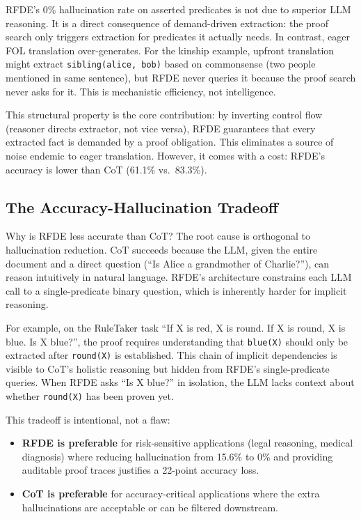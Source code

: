 \documentclass[11pt,letterpaper]{article}
\begin{document}
RFDE's 0\% hallucination rate on asserted predicates is not due to superior LLM reasoning. It is a direct consequence of
demand-driven extraction: the proof search only triggers extraction for predicates it actually needs. In contrast, eager FOL
translation over-generates. For the kinship example, upfront translation might extract \texttt{sibling(alice, bob)} based on
commonsense (two people mentioned in same sentence), but RFDE never queries it because the proof search never asks for it.
This is mechanistic efficiency, not intelligence.

This structural property is the core contribution: by inverting control flow (reasoner directs extractor, not vice versa),
RFDE guarantees that every extracted fact is demanded by a proof obligation. This eliminates a source of noise endemic to
eager translation. However, it comes with a cost: RFDE's accuracy is lower than CoT (61.1\% vs.\ 83.3\%).

\subsection{The Accuracy-Hallucination Tradeoff}

Why is RFDE less accurate than CoT? The root cause is orthogonal to hallucination reduction. CoT succeeds because the LLM,
given the entire document and a direct question (``Is Alice a grandmother of Charlie?''), can reason intuitively in natural
language. RFDE's architecture constrains each LLM call to a single-predicate binary question, which is inherently harder for
implicit reasoning.

For example, on the RuleTaker task ``If X is red, X is round. If X is round, X is blue. Is X blue?'', the proof requires
understanding that \texttt{blue(X)} should only be extracted after \texttt{round(X)} is established. This chain of implicit
dependencies is visible to CoT's holistic reasoning but hidden from RFDE's single-predicate queries. When RFDE asks ``Is X
blue?'' in isolation, the LLM lacks context about whether \texttt{round(X)} has been proven yet.

This tradeoff is intentional, not a flaw:
\begin{itemize}
  \item \textbf{RFDE is preferable} for risk-sensitive applications (legal reasoning, medical diagnosis) where reducing
    hallucination from 15.6\% to 0\% and providing auditable proof traces justifies a 22-point accuracy loss.
  \item \textbf{CoT is preferable} for accuracy-critical applications where the extra hallucinations are acceptable or can
    be filtered downstream.
\end{itemize}
\end{document}
